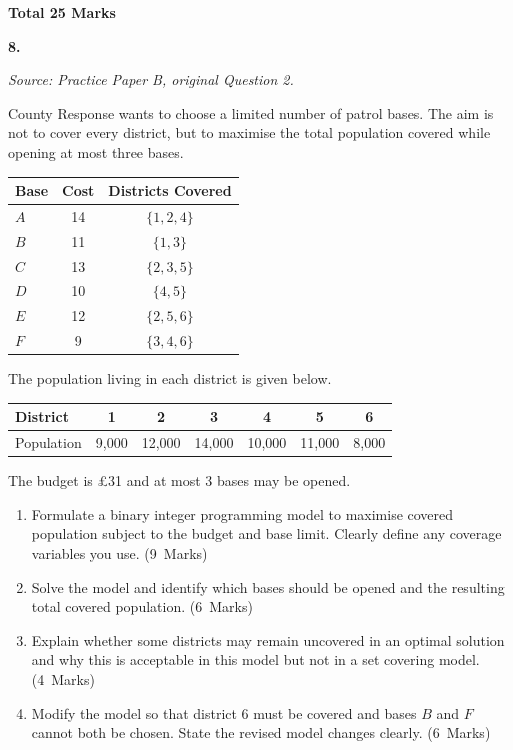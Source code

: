 \documentclass[11pt,a4paper]{article}
\newcommand{\markalloc}[1]{\nobreak\hfill\mbox{(#1 Marks)}}
\newcommand{\questiontotal}[1]{\begin{flushright}\textbf{Total #1 Marks}\end{flushright}}
\begin{document}
\questiontotal{25}

\newpage

\textbf{8.}

\textit{Source: Practice Paper B, original Question 2.}



County Response wants to choose a limited number of patrol bases.
The aim is not to cover every district, but to maximise the total population covered while opening at most three bases.

\begin{center}
\begin{tabular}{lcc}
\toprule
Base & Cost & Districts Covered \\
\midrule
$A$ & 14 & $\{1,2,4\}$ \\
$B$ & 11 & $\{1,3\}$ \\
$C$ & 13 & $\{2,3,5\}$ \\
$D$ & 10 & $\{4,5\}$ \\
$E$ & 12 & $\{2,5,6\}$ \\
$F$ & 9  & $\{3,4,6\}$ \\
\bottomrule
\end{tabular}
\end{center}

The population living in each district is given below.

\begin{center}
\begin{tabular}{lcccccc}
\toprule
District & 1 & 2 & 3 & 4 & 5 & 6 \\
\midrule
Population & 9{,}000 & 12{,}000 & 14{,}000 & 10{,}000 & 11{,}000 & 8{,}000 \\
\bottomrule
\end{tabular}
\end{center}

The budget is \pounds31 and at most 3 bases may be opened.

\begin{enumerate}
\item Formulate a binary integer programming model to maximise covered population subject to the budget and base limit. Clearly define any coverage variables you use. \markalloc{9}

\item Solve the model and identify which bases should be opened and the resulting total covered population. \markalloc{6}

\item Explain whether some districts may remain uncovered in an optimal solution and why this is acceptable in this model but not in a set covering model. \markalloc{4}

\item Modify the model so that district 6 must be covered and bases $B$ and $F$ cannot both be chosen. State the revised model changes clearly. \markalloc{6}
\end{enumerate}
\end{document}

